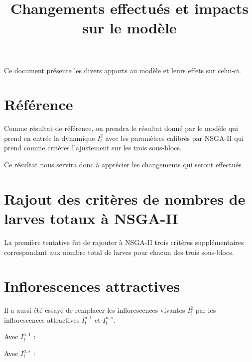 \documentclass[a4paper, 11pt]{article}
\title{Changements effectués et impacts sur le modèle}
\author{}
\date{}
\begin{document}
\maketitle

Ce document présente les divers apports au modèle et leurs effets sur celui-ci.

\section{Référence}

Comme résultat de référence, on prendra le résultat donné par le modèle qui prend en entrée la dynamique $I_t^2$ avec les paramètres calibrés par NSGA-II qui prend comme critères l'ajustement sur les trois sous-blocs.

Ce résultat nous servira donc à apprécier les changements qui seront effectués

\begin{figure}[h]
 \centering
\end{figure}

\newpage
\section{Rajout des critères de nombres de larves totaux à NSGA-II}

La première tentative fut de rajouter à NSGA-II trois critères supplémentaires correspondant aux nombre total de larves pour chacun des trois sous-blocs.

\begin{figure}[h]
 \centering
\end{figure}


\newpage
\section{Inflorescences attractives}

Il a aussi été essayé de remplacer les inflorescences vivantes $I_t^2$ par les inflorescences attractives $I_t^{a,1}$ et $I_t^{a,s}$.

Avec $I_t^{a, 1}$ : 

\begin{figure}[h]
 \centering
\end{figure}

Avec $I_t^{a,s}$ : 

\begin{figure}[h]
 \centering
\end{figure}
\end{document}
